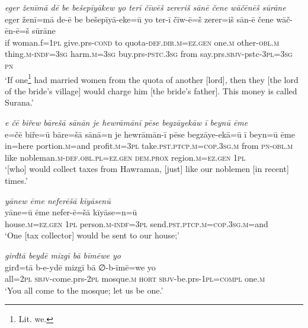 \ea \label{BP.18}
\textit{eger ženīmā dē be bešepīyākew yo terī čīwēš zereriš sānē čene wāčēnēš sūrāne} \\ 
\gll eger ženī=mā de-ē be bešepīyā-eke=ū yo ter-ī čīw-ē=š zerer=iš sān-ē čene wāč-ēn-ē=š sūrāne \\ 
 if woman.f\textsc{=\textsc{1pl}} give.prs\textsc{-cond} to quota\textsc{-def}\textsc{.dir}\textsc{.m}\textsc{=ez.gen} one\textsc{.m} other\textsc{-obl}\textsc{.m} thing\textsc{.m}\textsc{-indf}\textsc{=3sg} harm\textsc{.m}\textsc{=3sg} buy.prs\textsc{-pstc}\textsc{.3sg} from say.prs.\textsc{sbjv-}pstc\textsc{-3pl}\textsc{=3sg} \textsc{pn} \\ 
\glt `If one\footnote{Lit. we.} had married women from the quota of another [lord], then they [the lord of the bride's village] would charge him [the bride’s father]. This money is called Surana.'
\z 
 
\ea \label{BP.24}
\textit{e čē biřew bārešā sānān je hewrāmānī pēse begzāyekāw ī beynū ēme} \\ 
\gll e=čē biře=ū bāre=šā sānā=n je hewrāmān-ī pēse begzāye-ekā=ū ī beyn=ū ēme \\ 
 in=here portion\textsc{.m}=and profit\textsc{.m}\textsc{=3pl} take\textsc{.pst}\textsc{.ptcp}\textsc{.m}\textsc{=cop}\textsc{.3sg}\textsc{.m} from \textsc{pn}\textsc{-obl}\textsc{.m} like nobleman\textsc{.m}\textsc{-def}\textsc{.obl}\textsc{.pl}\textsc{=ez.gen} \textsc{dem.prox} region\textsc{.m}\textsc{=ez.gen} \textsc{1pl} \\ 
\glt `[who] would collect taxes from Hawraman, [just] like our noblemen [in recent] times.'
\z 
 
\ea \label{BP.42}
\textit{yānew ēme neferēšā kīyāsenū} \\ 
\gll yāne=ū ēme nefer-ē=šā kīyāse=n=ū \\ 
 house\textsc{.m}\textsc{=ez.gen} \textsc{1pl} person\textsc{.m}\textsc{-indf}\textsc{=3pl} send\textsc{.pst}\textsc{.ptcp}\textsc{.m}\textsc{=cop}\textsc{.3sg}\textsc{.m}=and \\ 
\glt `One [tax collector] would be sent to our house;'
\z 
 
\ea \label{BP.55}
\textit{girđtā beydē mizgī bā bīmēwe yo} \\ 
\gll girđ=tā b-e-ydē mizgī bā ∅-b-īmē=we yo \\ 
 all=\textsc{2pl} \textsc{sbjv-}come.prs-\textsc{2pl} mosque\textsc{.m} \textsc{hort} \textsc{sbjv-}be.prs-\textsc{1pl}\textsc{=compl} one\textsc{.m} \\ 
\glt `You all come to the mosque; let us be one.'
\z 
 
